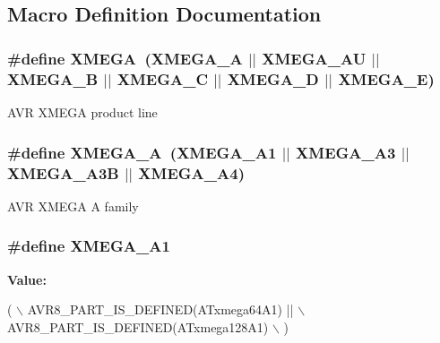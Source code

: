 \subsection{Macro Definition Documentation}
\hypertarget{group__xmega__part__macros__group_ga959bff90afbae437308a52eeb67b3368}{
\subsubsection[{X\-M\-E\-G\-A}]{\setlength{\rightskip}{0pt plus 5cm}\#define X\-M\-E\-G\-A~({\bf X\-M\-E\-G\-A\-\_\-\-A} $|$$|$ {\bf X\-M\-E\-G\-A\-\_\-\-A\-U} $|$$|$ {\bf X\-M\-E\-G\-A\-\_\-\-B} $|$$|$ {\bf X\-M\-E\-G\-A\-\_\-\-C} $|$$|$ {\bf X\-M\-E\-G\-A\-\_\-\-D} $|$$|$ {\bf X\-M\-E\-G\-A\-\_\-\-E})}}\label{group__xmega__part__macros__group_ga959bff90afbae437308a52eeb67b3368}
A\-V\-R X\-M\-E\-G\-A product line \hypertarget{group__xmega__part__macros__group_gab903a90d3a0bc99d7248eaecbb325a23}{
\subsubsection[{X\-M\-E\-G\-A\-\_\-\-A}]{\setlength{\rightskip}{0pt plus 5cm}\#define X\-M\-E\-G\-A\-\_\-\-A~(X\-M\-E\-G\-A\-\_\-\-A1 $|$$|$ X\-M\-E\-G\-A\-\_\-\-A3 $|$$|$ X\-M\-E\-G\-A\-\_\-\-A3\-B $|$$|$ X\-M\-E\-G\-A\-\_\-\-A4)}}\label{group__xmega__part__macros__group_gab903a90d3a0bc99d7248eaecbb325a23}
A\-V\-R X\-M\-E\-G\-A A family \hypertarget{group__xmega__part__macros__group_gaa0df665226b6faf69dcc137f1b78f074}{
\subsubsection[{X\-M\-E\-G\-A\-\_\-\-A1}]{\setlength{\rightskip}{0pt plus 5cm}\#define X\-M\-E\-G\-A\-\_\-\-A1}}\label{group__xmega__part__macros__group_gaa0df665226b6faf69dcc137f1b78f074}
{\bfseries Value\-:}
\begin{DoxyCode}
( \(\backslash\)
                AVR8\_PART\_IS\_DEFINED(ATxmega64A1)  || \(\backslash\)
                AVR8\_PART\_IS\_DEFINED(ATxmega128A1) \(\backslash\)
                )
\end{DoxyCode}
